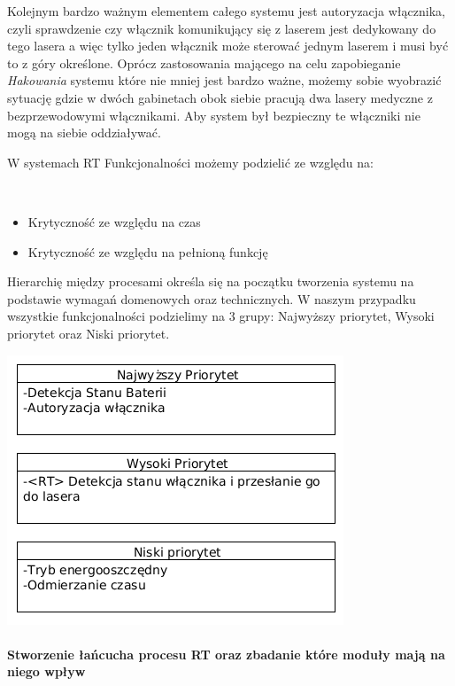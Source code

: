 Kolejnym bardzo ważnym elementem całego systemu jest autoryzacja włącznika, czyli sprawdzenie czy włącznik komunikujący się z laserem jest dedykowany do tego lasera a więc tylko jeden włącznik może sterować jednym laserem i musi być to z góry określone.
Oprócz zastosowania mającego na celu zapobieganie \textit{Hakowania} systemu które nie mniej jest bardzo ważne, możemy sobie wyobrazić sytuację gdzie w dwóch gabinetach obok siebie pracują dwa lasery medyczne z bezprzewodowymi włącznikami. Aby system był bezpieczny te włączniki nie mogą na siebie oddziaływać. \\
 \centerline{W systemach RT Funkcjonalności możemy podzielić ze względu na: } \\
	\begin{itemize}
    	\item Krytyczność ze względu na czas
        \item Krytyczność ze względu na pełnioną funkcję
    \end{itemize}
    
Hierarchię między procesami określa się na początku tworzenia systemu na podstawie wymagań domenowych oraz technicznych. W naszym przypadku wszystkie funkcjonalności podzielimy na 3 grupy: Najwyższy priorytet, Wysoki priorytet oraz Niski priorytet. \\

   \centerline{\includegraphics[scale=0.60]{./img/target_system/hierarchiaProcesow.png}} 


\paragraph{Stworzenie łańcucha procesu RT oraz zbadanie które moduły mają na niego wpływ} \mbox{}\\

